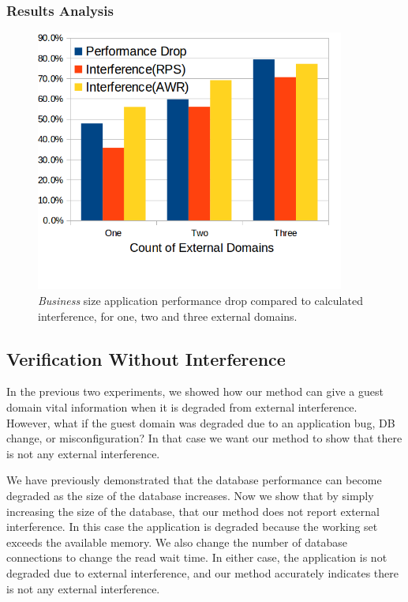 \subsubsection{Results Analysis}
\begin{figure}[!h]
  \begin{center}
  \includegraphics[width=4in]{images/Dell_PerfDrop_Int.png}
  \caption{\emph{Business} size application performance drop compared to calculated interference, for one, two and three external domains.}
  \label{fig:perfDropDell}
  \end{center}
\end{figure}


\subsection{Verification Without Interference}
In the previous two experiments, we showed how our method can give a guest domain vital information when it is degraded from external interference.  However, what if the guest domain was degraded due to an application bug, DB change, or misconfiguration?   In that case we want our method to show that there is not any external interference.

We have previously demonstrated that the database performance can become degraded as the size of the database increases.  Now we show that by simply increasing the size of the database, that our method does not report external interference.  In this case the application is degraded because the working set exceeds the available memory.  We also change the number of database connections to change the read wait time.  In either case, the application is not degraded due to external interference, and our method accurately indicates there is not any external interference.

